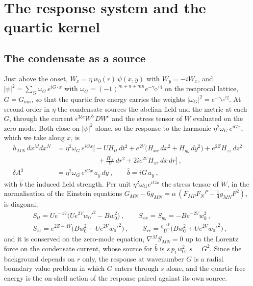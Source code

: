\section{The response system and the quartic kernel}
\label{app:response}

\subsection{The condensate as a source}
\label{app:response-source}

Just above the onset, $W_x = \eta\,
w_0(r)\,\psi(x,y)$ with $W_y = -iW_x$, and $|\psi|^2 = \sum_G \omega_G\,
e^{iG\cdot x}$ with $\omega_G = (-1)^{m+n+mn}e^{-\gamma_G/4}$ on the reciprocal
lattice, $G = G_{mn}$, so that the quartic free energy carries the weights
$|\omega_G|^2 = e^{-\gamma_G/2}$.
At second order in $\eta$ the condensate sources the abelian field and
the metric at each $G$, through the current $\epsilon^{3bc}W^b\,DW^c$ and the
stress tensor of $W$ evaluated on the zero mode. Both close on
$|\psi|^2$ alone, so the response to the harmonic $\eta^2\omega_G\,e^{iGx}$, which we take along $x$, is
\begin{equation}
\begin{split}
h_{MN}\,dx^Mdx^N &= \eta^2\omega_G\,e^{iGx}\Big[-U H_{tt}\,dt^2 + e^{2V}\big(H_{xx}\,dx^2 + H_{yy}\,dy^2\big) + e^{2Z}H_{zz}\,dz^2 \\
&\qquad\qquad\qquad + \frac{H_{rr}}{U}\,dr^2 + 2ie^{2V}H_{xr}\,dx\,dr\Big]~, \\
\delta A^3 &= \eta^2\omega_G\,e^{iGx}\,a_y\,dy~, \qquad \hat b = iG\,a_y~,
\end{split}
\end{equation}
with $\hat b$ the induced field strength. Per unit $\eta^2\omega_G e^{iGx}$
the stress tensor of $W$, in the normalisation of the Einstein equations
$G_{MN} - 6g_{MN} = \alpha\,(F_{MP}F_N{}^P - \tfrac14 g_{MN}F^2)$, is diagonal,
\begin{equation}
\begin{split}
&S_{tt} = Ue^{-4V}\big(Ue^{2V}w_0'^2 - Bw_0^2\big)~, \qquad
S_{xx} = S_{yy} = -Be^{-2V}w_0^2~, \qquad \\
&S_{zz} = e^{2Z-4V}\big(Bw_0^2 - Ue^{2V}w_0'^2\big)~, \qquad
S_{rr} = \frac{e^{-4V}}{U}\big(Bw_0^2 + Ue^{2V}w_0'^2\big)~,
\end{split}
\end{equation}
and it is conserved on the zero-mode equation, $\nabla^M S_{MN} = 0$ up to
the Lorentz force on the condensate current, whose source for $\hat b$ is
$s\,p_1w_0^2$, $s = G^2$. Since the background depends on $r$ only, the response at
wavenumber $G$ is a radial boundary value problem in which $G$ enters
through $s$ alone, and the quartic free energy is the on-shell action of the
response paired against its own source.

